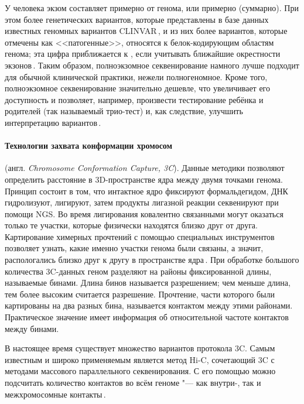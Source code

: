 \documentclass[a4paper,14pt]{extarticle}
\newcommand{\ecitep}[1]{\textenglish{\citep{#1}}}
\newcommand{\engterm}[1]{англ. \textenglish{\textit{#1}}}
\begin{document}
У человека экзом составляет примерно  от генома, или примерно  (суммарно).
При этом более  генетических вариантов, которые представлены в базе данных известных геномных вариантов CLINVAR\,\ecitep{Landrum_2017}, и из них более  вариантов, которые отмечены как <<патогенные>>, относятся к белок-кодирующим областям генома;
эта цифра приближается к , если учитывать ближайшие окрестности экзонов\,\ecitep{Barbitoff_2020}.
Таким образом, полноэкзомное секвенирование намного лучше подходит для обычной клинической практики, нежели полногеномное.
Кроме того, полноэкзомное секвенирование значительно дешевле, что увеличивает его доступность и позволяет, например, произвести тестирование ребёнка и родителей (так называемый трио-тест) и, как следствие, улучшить интерпретацию вариантов\,\ecitep{Yohe_2017}.

\paragraph{Технологии захвата конформации хромосом} (\engterm{Chromosome Conformation Capture, 3C}).
Данные методики позволяют определить расстояние в 3D-пространстве ядра между двумя точками генома.
Принцип состоит в том, что интактное ядро фиксируют формальдегидом, ДНК гидролизуют, лигируют, затем продукты лигазной реакции секвенируют при помощи NGS.
Во время лигирования ковалентно связанными могут оказаться только те участки, которые физически находятся близко друг от друга.
Картирование химерных прочтений с помощью специальных инструментов позволяет узнать, какие именно участки генома были связаны, а значит, распологались близко друг к другу в пространстве ядра\,\ecitep{Lieberman_Aiden_2009}.
При обработке большого количества 3C-данных геном разделяют на районы фиксированной длины, называемые бинами.
Длина бинов называется разрешением; чем меньше длина, тем более высоким считается разрешение.
Прочтение, части которого были картированы на два разных бина, называется контактом между этими районами.
Практическое значение имеет информация об относительной частоте контактов между бинами.

В настоящее время существует множество вариантов протокола 3C.
Самым известным и широко применяемым является метод Hi-C, сочетающий 3C с методами массового параллельного секвенирования.
С его помощью можно подсчитать количество контактов во всём геноме "--- как внутри-, так и межхромосомные контакты\,\ecitep{Oluwadare_2019}.
\end{document}
